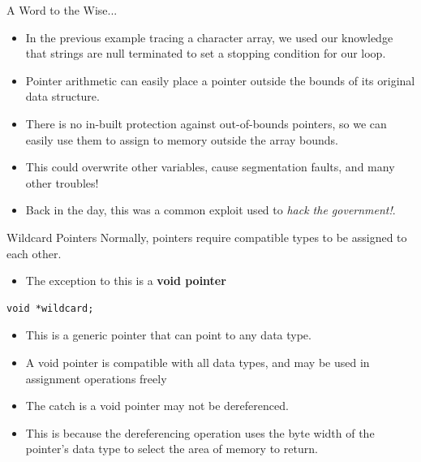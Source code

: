 \documentclass[11pt]{beamer}
\begin{document}
\begin{frame}{A Word to the Wise...}
\begin{itemize}
\item In the previous example tracing a character array, we used our knowledge that strings are null terminated to set a stopping condition for our loop.
\item Pointer arithmetic can easily place a pointer outside the bounds of its original data structure.
\item There is no in-built protection against out-of-bounds pointers, so we can easily use them to assign to memory outside the array bounds.
\item This could overwrite other variables, cause segmentation faults, and many other troubles! 
\item Back in the day, this was a common exploit used to \emph{hack the government!}. 
\end{itemize}
\end{frame}

\begin{frame}[fragile=singleslide]{Wildcard Pointers}
Normally, pointers require compatible types to be assigned to each other.
\begin{itemize}
\item The exception to this is a \textbf{void pointer}
\end{itemize}
\begin{lstlisting}[style=C]
void *wildcard;
\end{lstlisting}
\begin{itemize}
\item This is a generic pointer that can point to any data type.
\item A void pointer is compatible with all data types, and may be used in assignment operations freely
\item The catch is a void pointer may not be dereferenced.  
\item This is because the dereferencing operation uses the byte width of the pointer's data type to select the area of memory to return. 
\end{itemize}
\end{frame}
\end{document}
